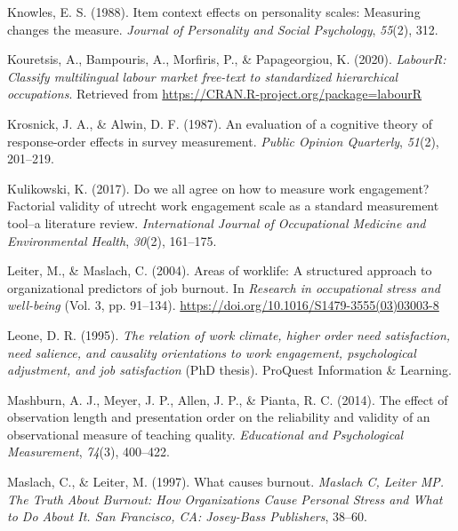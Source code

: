 \documentclass[
  english,
  man]{apa6}
\begin{document}
\leavevmode\hypertarget{ref-knowles1988item}{}%
Knowles, E. S. (1988). Item context effects on personality scales: Measuring changes the measure. \emph{Journal of Personality and Social Psychology}, \emph{55}(2), 312.

\leavevmode\hypertarget{ref-R-labourR}{}%
Kouretsis, A., Bampouris, A., Morfiris, P., \& Papageorgiou, K. (2020). \emph{LabourR: Classify multilingual labour market free-text to standardized hierarchical occupations}. Retrieved from \url{https://CRAN.R-project.org/package=labourR}

\leavevmode\hypertarget{ref-krosnick1987evaluation}{}%
Krosnick, J. A., \& Alwin, D. F. (1987). An evaluation of a cognitive theory of response-order effects in survey measurement. \emph{Public Opinion Quarterly}, \emph{51}(2), 201--219.

\leavevmode\hypertarget{ref-kulikowski2017we}{}%
Kulikowski, K. (2017). Do we all agree on how to measure work engagement? Factorial validity of utrecht work engagement scale as a standard measurement tool--a literature review. \emph{International Journal of Occupational Medicine and Environmental Health}, \emph{30}(2), 161--175.

\leavevmode\hypertarget{ref-leiter_areas_2004}{}%
Leiter, M., \& Maslach, C. (2004). Areas of worklife: A structured approach to organizational predictors of job burnout. In \emph{Research in occupational stress and well-being} (Vol. 3, pp. 91--134). \url{https://doi.org/10.1016/S1479-3555(03)03003-8}

\leavevmode\hypertarget{ref-leone_relation_1995}{}%
Leone, D. R. (1995). \emph{The relation of work climate, higher order need satisfaction, need salience, and causality orientations to work engagement, psychological adjustment, and job satisfaction} (PhD thesis). ProQuest Information \& Learning.

\leavevmode\hypertarget{ref-mashburn2014effect}{}%
Mashburn, A. J., Meyer, J. P., Allen, J. P., \& Pianta, R. C. (2014). The effect of observation length and presentation order on the reliability and validity of an observational measure of teaching quality. \emph{Educational and Psychological Measurement}, \emph{74}(3), 400--422.

\leavevmode\hypertarget{ref-maslach1997causes}{}%
Maslach, C., \& Leiter, M. (1997). What causes burnout. \emph{Maslach C, Leiter MP. The Truth About Burnout: How Organizations Cause Personal Stress and What to Do About It. San Francisco, CA: Josey-Bass Publishers}, 38--60.
\end{document}
